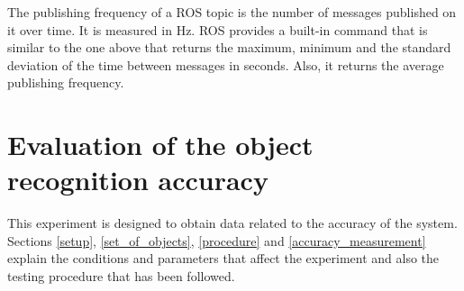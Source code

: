 		The publishing frequency of a ROS topic is the number of messages published on it over time. 
		It is measured in Hz. 
		ROS provides a built-in command that is similar to the one above that returns the maximum, minimum and the standard deviation of the time between messages in seconds. 
		Also, it returns the average publishing frequency.  



\section{Evaluation of the object recognition accuracy}
\label{accuracy_experiment}

	This experiment is designed to obtain data related to the accuracy of the system. 
	Sections \ref{setup}, \ref{set_of_objects}, \ref{procedure} and \ref{accuracy_measurement} explain the conditions and parameters that affect the experiment and also the testing procedure that has been followed. 




